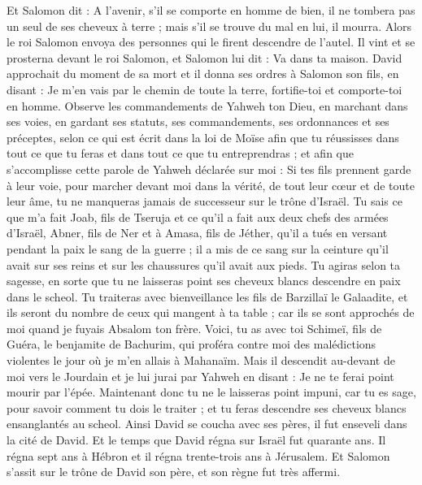 \begin{multicols}{2}
Et Salomon dit : A l’avenir, s’il se comporte en homme de bien, il ne tombera pas un seul de ses cheveux à terre ; mais s'il se trouve du mal en lui, il mourra.
Alors le roi Salomon envoya des personnes qui le firent descendre de l'autel. Il vint et se prosterna devant le roi Salomon, et Salomon lui dit : Va dans ta maison.
\VerseOne{}David approchait du moment de sa mort et il donna ses ordres à Salomon son fils, en disant :
Je m'en vais par le chemin de toute la terre, fortifie-toi et comporte-toi en homme.
Observe les commandements de Yahweh ton Dieu, en marchant dans ses voies, en gardant ses statuts, ses commandements, ses ordonnances et ses préceptes, selon ce qui est écrit dans la loi de Moïse afin que tu réussisses dans tout ce que tu feras et dans tout ce que tu entreprendras ;
et afin que s’accomplisse cette parole de Yahweh déclarée sur moi : Si tes fils prennent garde à leur voie, pour marcher devant moi dans la vérité, de tout leur cœur et de toute leur âme, tu ne manqueras jamais de successeur sur le trône d'Israël.
Tu sais ce que m'a fait Joab, fils de Tseruja et ce qu'il a fait aux deux chefs des armées d'Israël, Abner, fils de Ner et à Amasa, fils de Jéther, qu'il a tués en versant pendant la paix le sang de la guerre ; il a mis de ce sang sur la ceinture qu'il avait sur ses reins et sur les chaussures qu'il avait aux pieds.
Tu agiras selon ta sagesse, en sorte que tu ne laisseras point ses cheveux blancs descendre en paix dans le scheol.
Tu traiteras avec bienveillance les fils de Barzillaï le Galaadite, et ils seront du nombre de ceux qui mangent à ta table ; car ils se sont approchés de moi quand je fuyais Absalom ton frère.
Voici, tu as avec toi Schimeï, fils de Guéra, le benjamite de Bachurim, qui proféra contre moi des malédictions violentes le jour où je m'en allais à Mahanaïm. Mais il descendit au-devant de moi vers le Jourdain et je lui jurai par Yahweh en disant : Je ne te ferai point mourir par l'épée.
Maintenant donc tu ne le laisseras point impuni, car tu es sage, pour savoir comment tu dois le traiter ; et tu feras descendre ses cheveux blancs ensanglantés au scheol.
Ainsi David se coucha avec ses pères, il fut enseveli dans la cité de David.
Et le temps que David régna sur Israël fut quarante ans. Il régna sept ans à Hébron et il régna trente-trois ans à Jérusalem.
Et Salomon s'assit sur le trône de David son père, et son règne fut très affermi.

\end{multicols}
